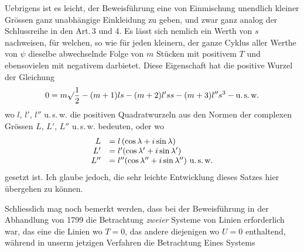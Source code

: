 Uebrigens ist es leicht, der Beweisführung eine von Einmischung unendlich
kleiner Grössen ganz unabhängige Einkleidung zu geben, und zwar ganz analog
der Schlussreihe in den Art.\,3 und 4. Es lässt sich nemlich ein Werth von $s$ nachweisen, für welchen, so wie für jeden kleinern, der ganze Cyklus aller Werthe
von $\psi$ dieselbe abwechselnde Folge von $m$ Stücken mit positivem $T$ und ebensovielen mit negativem darbietet. Diese Eigenschaft hat die positive Wurzel der
Gleichung
\[
0=m\surd\frac{1}{2}-(m+1)ls-(m+2)l'ss-(m+3)l''s^3-\mbox{u.\,s.\,w.}
\]
wo $l$, $l'$, $l''$ u.\,s.\,w. die positiven Quadratwurzeln aus den Normen der complexen
Grössen $L$, $L'$, $L''$ u.\,s.\,w. bedeuten, oder wo
\[
\begin{array}{rl}
L&=l\,(\cos\lambda+i\sin\lambda)\\
L'&=l'(\cos\lambda'+i\sin\lambda')\\
L''&=l''(\cos\lambda''+i\sin\lambda'')\ \mbox{u.\,s.\,w.}
\end{array}
\]
gesetzt ist. Ich glaube jedoch, die sehr leichte Entwicklung dieses Satzes hier
übergehen zu können.

Schliesslich mag noch bemerkt werden, dass bei der Beweisführung in der
Abhandlung von 1799 die Betrachtung \emph{zweier} Systeme von Linien erforderlich
war, das eine die Linien wo $T=0$, das andere diejenigen wo $U=0$ enthaltend, während in unserm jetzigen Verfahren die Betrachtung Eines Systems

